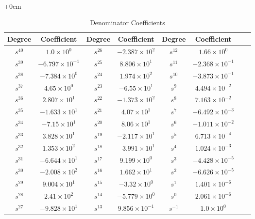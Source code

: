 \documentclass{article}
\begin{document}
\begin{table}[H]
  \centering
		\begin{adjustwidth}{+0cm}{}
		\caption{Denominator Coefficients}
		\begin{tabular}{|c|c|c|c|c|c|c|c|}
\hline
Degree & Coefficient & Degree & Coefficient & Degree & Coefficient\\
\hline
$s^{ 40 }$ & $ 1.0 \times 10^{ 0 }$ & $s^{ 26 }$ & $ -2.387 \times 10^{ 2 }$ & $s^{ 12 }$ & $ 1.66 \times 10^{ 0 }$  \\
\hline
$s^{ 39 }$ & $ -6.797 \times 10^{ -1 }$ & $s^{ 25 }$ & $ 8.806 \times 10^{ 1 }$ & $s^{ 11 }$ & $ -2.368 \times 10^{ -1 }$  \\
\hline
$s^{ 38 }$ & $ -7.384 \times 10^{ 0 }$ & $s^{ 24 }$ & $ 1.974 \times 10^{ 2 }$ & $s^{ 10 }$ & $ -3.873 \times 10^{ -1 }$  \\
\hline
$s^{ 37 }$ & $ 4.65 \times 10^{ 0 }$ & $s^{ 23 }$ & $ -6.55 \times 10^{ 1 }$ & $s^{ 9 }$ & $ 4.494 \times 10^{ -2 }$  \\
\hline
$s^{ 36 }$ & $ 2.807 \times 10^{ 1 }$ & $s^{ 22 }$ & $ -1.373 \times 10^{ 2 }$ & $s^{ 8 }$ & $ 7.163 \times 10^{ -2 }$  \\
\hline
$s^{ 35 }$ & $ -1.633 \times 10^{ 1 }$ & $s^{ 21 }$ & $ 4.07 \times 10^{ 1 }$ & $s^{ 7 }$ & $ -6.492 \times 10^{ -3 }$  \\
\hline
$s^{ 34 }$ & $ -7.15 \times 10^{ 1 }$ & $s^{ 20 }$ & $ 8.06 \times 10^{ 1 }$ & $s^{ 6 }$ & $ -1.011 \times 10^{ -2 }$  \\
\hline
$s^{ 33 }$ & $ 3.828 \times 10^{ 1 }$ & $s^{ 19 }$ & $ -2.117 \times 10^{ 1 }$ & $s^{ 5 }$ & $ 6.713 \times 10^{ -4 }$  \\
\hline
$s^{ 32 }$ & $ 1.353 \times 10^{ 2 }$ & $s^{ 18 }$ & $ -3.991 \times 10^{ 1 }$ & $s^{ 4 }$ & $ 1.024 \times 10^{ -3 }$  \\
\hline
$s^{ 31 }$ & $ -6.644 \times 10^{ 1 }$ & $s^{ 17 }$ & $ 9.199 \times 10^{ 0 }$ & $s^{ 3 }$ & $ -4.428 \times 10^{ -5 }$  \\
\hline
$s^{ 30 }$ & $ -2.008 \times 10^{ 2 }$ & $s^{ 16 }$ & $ 1.662 \times 10^{ 1 }$ & $s^{ 2 }$ & $ -6.626 \times 10^{ -5 }$  \\
\hline
$s^{ 29 }$ & $ 9.004 \times 10^{ 1 }$ & $s^{ 15 }$ & $ -3.32 \times 10^{ 0 }$ & $s^{ 1 }$ & $ 1.401 \times 10^{ -6 }$  \\
\hline
$s^{ 28 }$ & $ 2.41 \times 10^{ 2 }$ & $s^{ 14 }$ & $ -5.779 \times 10^{ 0 }$ & $s^{ 0 }$ & $ 2.061 \times 10^{ -6 }$  \\
\hline
$s^{ 27 }$ & $ -9.828 \times 10^{ 1 }$ & $s^{ 13 }$ & $ 9.856 \times 10^{ -1 }$ & $s^{ -1 }$ & $ 1.0 \times 10^{ 0 }$  \\
\hline
  	\end{tabular}
	\end{adjustwidth}
\end{table}
\end{document}
